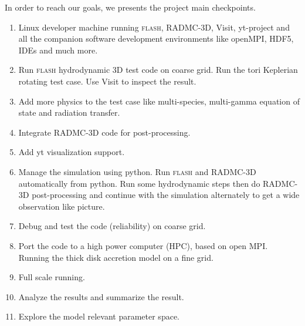 \documentclass[a4paper,12pt,modern]{aastex62}
\begin{document}
In order to reach our goals, we presents the project main checkpoints.
\begin{enumerate}
\item Linux developer machine running \textsc{flash}, RADMC-3D, Visit, yt-project and all the companion software development environments like openMPI, HDF5, IDEs and much more.
\item Run \textsc{flash} hydrodynamic 3D test code on coarse grid. Run the tori Keplerian rotating test case. Use Visit to inspect the result.
\item Add more physics to the test case like multi-species, multi-gamma equation of state and radiation transfer.
\item Integrate RADMC-3D code \citep{2012ascl.soft02015D} for post-processing.
\item Add yt visualization support.
\item Manage the simulation using python. Run \textsc{flash} and RADMC-3D automatically from python. Run some hydrodynamic steps then do RADMC-3D post-processing and continue with the simulation alternately to get a wide observation like picture.
\item Debug and test the code (reliability) on coarse grid.
\item Port the code to a high power computer (HPC), based on open MPI. Running the thick disk accretion model on a fine grid.
\item Full scale running.
\item Analyze the results and summarize the result.
\item Explore the model relevant parameter space.
\end{enumerate}


\appendix
\end{document}
